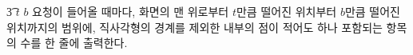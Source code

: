 \t{3} $t$ $b$ 요청이 들어올 때마다, 화면의 맨 위로부터 $t$만큼 떨어진 위치부터 $b$만큼 떨어진 위치까지의 범위에, 직사각형의 경계를 제외한 내부의 점이 적어도 하나 포함되는 항목의 수를 한 줄에 출력한다.

